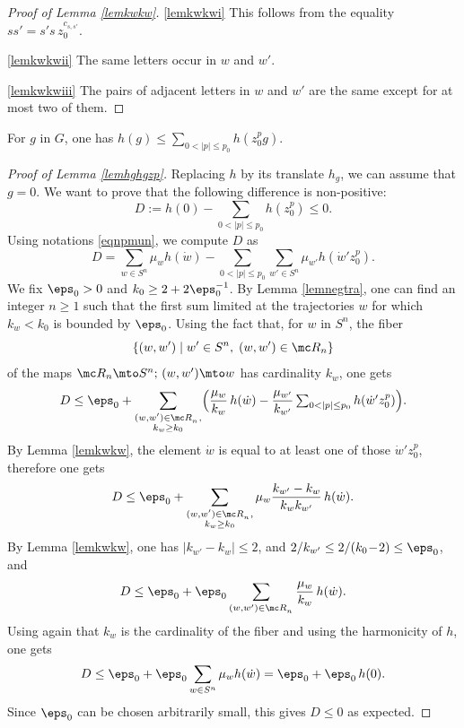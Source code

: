 \skpt
\begin{proof}[Proof of Lemma \ref{lemkwkw}]
\eqref{lemkwkwi} This follows from the equality $ss'=s's\, z_0^{c_{s,s'}}$.

\eqref{lemkwkwii} The same letters occur in $w$ and $w'$.

\eqref{lemkwkwiii} The pairs of adjacent letters in $w$ and $w'$ are the same except for at most two of them.
\end{proof}

\begin{Lem}
\label{lemhghgzp}
For $g$ in $G$, one has $h(g)\leq \sum_{0<|p|\leq p_0}h(z_0^pg)$.
\end{Lem}

\begin{proof}[Proof of Lemma \ref{lemhghgzp}]
Replacing $h$ by its translate $h_g$, we can assume that $g=0$.
We want to prove that the following difference is non-positive:
\[
D:=
h(0)- \sum_{0<|p|\leq p_0}h(z_0^p) \leq 0.
\]
Using notations \eqref{eqnpmun}, we compute $D$ as
\[
D=
\sum_{w\in S^n}\mu_wh(\dot{w})-
\sum_{0<|p|\leq p_0}\sum_{w'\in S^n}\mu_{w'}h(\dot{w}'z_0^p).
\]
We fix $\eps_0>0$ and $k_0\geq 2+2\eps_0^{-1}$.
By Lemma \ref{lemnegtra}, one can find an integer $n\geq 1$
such that
the first sum limited at the trajectories $w$ for which $k_w<k_0$ is bounded by $\eps_0$. Using the fact that, for $w$ in $S^n$, the fiber
\[
\{(w,w')\mid w'\in S^n,\; (w,w')\in \mc R_n\}
\]
of the maps
$\mc R_n\mto S^n;\,(w,w')\mto w$ has cardinality $k_w$, one gets
\[
D\leq
\eps_0+
\sum_{\substack{(w,w')\in \mc R_{_n},\\ k_w\geq k_0}}
\Bigl(\frac{\mu_w}{k_w}\,h(\dot{w})-
\frac{\mu_{w'}}{k_{w'}}
\textstyle\sum_{0<|p|\leq p_0}h(\dot{w}'z_0^p)\Bigr).
\]
By Lemma \ref{lemkwkw}, the element $\dot{w}$ is equal
to at least one of those $\dot{w}'z_0^p$, therefore one gets
\[
D\leq
\eps_0+
\sum_{\substack{(w,w')\in \mc R_{_n},\\ k_w\geq k_0}}
\mu_w\frac{k_{w'}-k_w}{k_wk_{w'}}\,h(\dot{w}).
\]
By Lemma \ref{lemkwkw}, one has $|k_{w'}\!-\!k_w|\leq 2$,
and $2/k_{w'}\leq 2/(k_0\!-\!2)\leq \eps_0$, and
\[
D\leq
\eps_0+
\eps_0
\sum_{(w,w')\in \mc R_{_n}}
\frac{\mu_w}{k_w}\,h(\dot{w}).
\]
Using again that $k_w$ is the cardinality of the fiber and using the harmonicity of $h$,
one gets
\[
D\leq
\eps_0+
\eps_0
\sum_{w\in S^n}
\mu_w h(\dot{w})
=
\eps_0+
\eps_0\, h(0).
\]
Since $\eps_0$ can be chosen arbitrarily small, this gives $D\leq 0$ as expected.
\end{proof}

